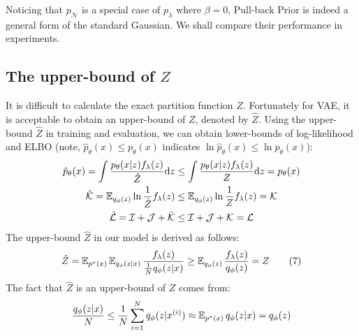 Noticing that $p_\mathcal{N}$ is a special case of $p_\lambda$ where $\beta = 0$, Pull-back Prior is indeed a general form of the standard Gaussian.  We shall compare their performance in experiments. 

\subsection{The upper-bound of $Z$}\label{subsec:determine_z}

It is difficult to calculate the exact partition function $Z$. Fortunately for VAE, it is acceptable to obtain an upper-bound of $Z$, denoted by $\hat{Z}$. Using the upper-bound $\hat{Z}$ in training and evaluation, we can obtain lower-bounds of log-likelihood and ELBO (note, $\hat{p}_\theta(x) \leq p_\theta(x)$ indicates $\ln \hat{p}_\theta(x) \leq \ln p_\theta(x)$):
\begin{align*}
	\hat{p}_\theta(x) = \int \frac{p_\theta(x|z) f_\lambda(z)}{\hat{Z}}  \mathrm{d} z &\leq \int \frac{p_\theta(x|z) f_\lambda(z)}{Z} \mathrm{d} z = p_\theta(x)  \\
	\mathcal{\hat{K}} = \operatorname{\mathbb{E}}_{q_\phi(z)} \ln \frac{1}{\hat{Z}} f_\lambda(z) &\leq \operatorname{\mathbb{E}}_{q_\phi(z)} \ln \frac{1}{Z}  f_\lambda(z) = \mathcal{K}   \\
    \mathcal{\hat{L}} =  \mathcal{I} + \mathcal{J} + \mathcal{\hat{K}} &\leq \mathcal{I} + \mathcal{J} + \mathcal{K} = \mathcal{L}
\end{align*}
The upper-bound $\hat{Z}$ in our model is derived as follows:
\begin{align*}\label{eq:Z_estimator}
    \hat{Z} = \operatorname{\mathbb{E}}_{p^*(x)}\operatorname{\mathbb{E}}_{q_\phi(z|x)} \frac{f_\lambda(z)}{\frac{1}{N}q_\phi(z|x)} \geq
	\operatorname{\mathbb{E}}_{q_\phi(z)}\frac{f_\lambda(z)}{q_\phi(z)} = Z \tag{7}
\end{align*}
The fact that $\hat{Z}$ is an upper-bound of $Z$ comes from:
\begin{equation*}
	\frac{q_\phi(z|x)}{N} \leq \frac{1}{N}\sum_{i=1}^N q_\phi(z|x^{(i)}) \approx \operatorname{\mathbb{E}}_{p^*(x)}q_\phi(z|x) = q_\phi(z)
\end{equation*}


